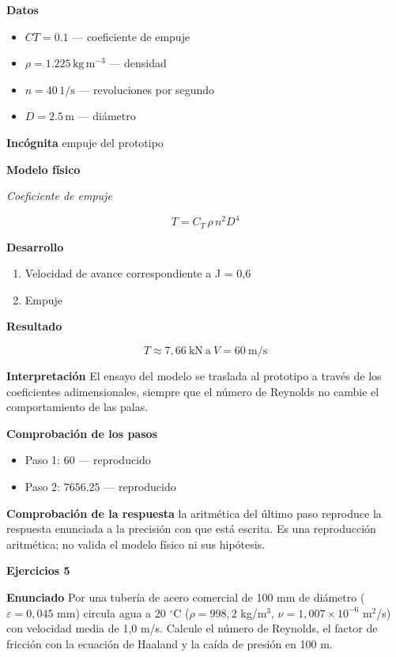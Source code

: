 \documentclass[10pt,openany]{book}
\begin{document}
\noindent\textbf{Datos}
\begin{itemize}
\item $CT = 0.1$ — coeficiente de empuje
\item $\rho = 1.225\,\mathrm{kg}\,\mathrm{m}^{-3}$ — densidad
\item $n = 40\,\mathrm{1/s}$ — revoluciones por segundo
\item $D = 2.5\,\mathrm{m}$ — diámetro
\end{itemize}

\noindent\textbf{Incógnita}
empuje del prototipo

\noindent\textbf{Modelo físico}

\noindent\textit{Coeficiente de empuje}

\[
T = C_T\,\rho\,n^{2}D^{4}
\]

\noindent\textbf{Desarrollo}
\begin{enumerate}
\item
Velocidad de avance correspondiente a J = 0,6
\item
Empuje
\end{enumerate}

\noindent\textbf{Resultado}

\[
T \approx 7{,}66\ \mathrm{kN}\ \text{a}\ V = 60\ \mathrm{m/s}
\]

\noindent\textbf{Interpretación}
El ensayo del modelo se traslada al prototipo a través de los coeficientes adimensionales, siempre que el número de Reynolds no cambie el comportamiento de las palas.

\noindent\textbf{Comprobación de los pasos}
\begin{itemize}
\item Paso 1: $60$ — reproducido
\item Paso 2: $7656.25$ — reproducido
\end{itemize}

\noindent\textbf{Comprobación de la respuesta} la aritmética del último paso reproduce la respuesta enunciada a la precisión con que está escrita. Es una reproducción aritmética; no valida el modelo físico ni sus hipótesis.

\noindent\textbf{Ejercicios 5}

\noindent\textbf{Enunciado}
Por una tubería de acero comercial de 100 mm de diámetro (\(\varepsilon = 0{,}045\) mm) circula agua a 20 \(^\circ\)C (\(\rho = 998{,}2\) kg/m\(^3\), \(\nu = 1{,}007\times 10^{-6}\) m\(^2\)/s) con velocidad media de 1,0 m/s. Calcule el número de Reynolds, el factor de fricción con la ecuación de Haaland y la caída de presión en 100 m.
\end{document}
